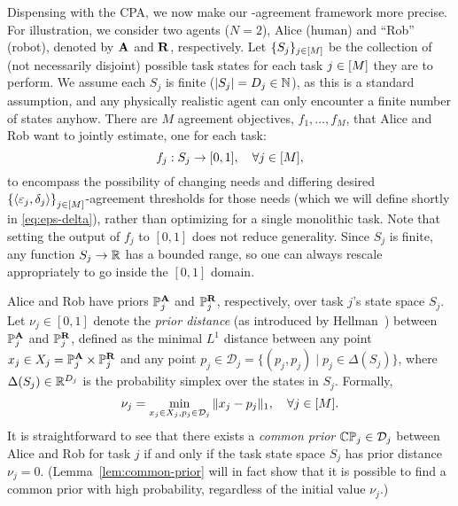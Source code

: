 Dispensing with the CPA, we now make our \agree-agreement framework more precise.
For illustration, we consider two agents ($N=2$), Alice (human) and ``Rob'' (robot), denoted by $\mathbf{A}$ and $\mathbf{R}$, respectively.
Let $\{S_j\}_{j\in [M]}$ be the collection of (not necessarily disjoint) possible task states for each task $j\in [M]$ they are to perform. 
We assume each $S_j$ is finite ($|S_j| = D_j \in \mathbb{N}$), as this is a standard assumption, and any physically realistic agent can only encounter a finite number of states anyhow.
There are $M$ agreement objectives, $f_1, \dots, f_M$, that Alice and Rob want to jointly estimate, one for each task:
\begin{equation*}
f_j : S_j \to [0, 1], \quad \forall j \in [M],
\end{equation*}
to encompass the possibility of changing needs and differing desired $\left\{\left \langle \varepsilon_j, \delta_j \right \rangle \right\}_{j \in [M]}$-agreement thresholds for those needs (which we will define shortly in \eqref{eq:eps-delta}), rather than optimizing for a single monolithic task.
Note that setting the output of $f_j$ to $[0, 1]$ does not reduce generality.
Since $S_j$ is finite, any function $S_j \to \mathbb{R}$ has a bounded range, so one can always rescale appropriately to go inside the $[0, 1]$ domain.

Alice and Rob have priors $\mathbb{P}^{\mathbf{A}}_j$ and $\mathbb{P}^{\mathbf{R}}_j$, respectively, over task $j$'s state space $S_j$. 
Let $\nu_j \in [0,1]$ denote the \emph{prior distance} (as introduced by Hellman~\citep{hellman2013almost}) between $\mathbb{P}^{\mathbf{A}}_j$ and $\mathbb{P}^{\mathbf{R}}_j$, defined as the minimal $L^1$ distance between any point $x_j \in X_j = \mathbb{P}^{\mathbf{A}}_j \times \mathbb{P}^{\mathbf{R}}_j$ and any point $p_j \in \mathcal{D}_j
 = \{(p_j, p_j) \mid p_j \in \Delta(S_j)\}$, where $\Delta(S_j)\in \mathbb{R}^{D_j}$ is the probability simplex over the states in $S_j$. 
Formally,
\begin{equation}\label{eq:prior-dist}
\nu_j = \min_{x_j \in X_j, p_j \in \mathcal{D}_j} \|x_j - p_j\|_1, \quad \forall j \in [M].
\end{equation}
It is straightforward to see that there exists a \emph{common prior} $\mathbb{C}\mathbb{P}_j \in \mathcal{D}_j$ between Alice and Rob for task $j$ if and only if the task state space $S_j$ has prior distance $\nu_j = 0$.
(Lemma~\ref{lem:common-prior} will in fact show that it is possible to find a common prior with high probability, regardless of the initial value $\nu_j$.)

